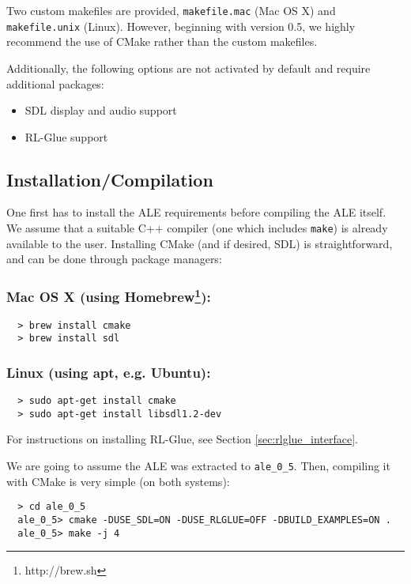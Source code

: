 \documentclass[12pt]{article}
\begin{document}
Two custom makefiles are provided, \verb+makefile.mac+ (Mac OS X) and \verb+makefile.unix+ (Linux). However, beginning with version 0.5, we highly recommend the use of CMake rather than the custom makefiles.

Additionally, the following options are not activated by default and require additional packages:
\begin{itemize}
  \item SDL display and audio support
  \item RL-Glue support
\end{itemize}

\subsection{Installation/Compilation}\label{subsec:installation_compilation}

One first has to install the ALE requirements before compiling the ALE itself. 
We assume that a suitable C++ compiler (one which includes \verb+make+) is already available to 
the user. Installing CMake (and if desired, SDL) is straightforward, and can be done through 
package managers: 

\subsubsection*{Mac OS X (using Homebrew\footnote{http://brew.sh}):}
\begin{verbatim}
  > brew install cmake
  > brew install sdl
\end{verbatim}

\subsubsection*{Linux (using apt, e.g. Ubuntu):}
\begin{verbatim}
  > sudo apt-get install cmake
  > sudo apt-get install libsdl1.2-dev
\end{verbatim}

For instructions on installing RL-Glue, see Section \ref{sec:rlglue_interface}.

We are going to assume the ALE was extracted to \verb+ale_0_5+. Then, compiling it
with CMake is very simple (on both systems):
\begin{verbatim}
  > cd ale_0_5
  ale_0_5> cmake -DUSE_SDL=ON -DUSE_RLGLUE=OFF -DBUILD_EXAMPLES=ON .
  ale_0_5> make -j 4
\end{verbatim}
\end{document}
